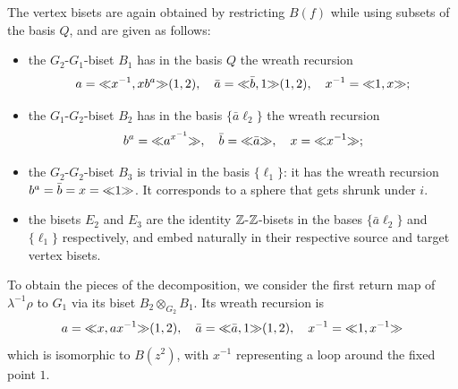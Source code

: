 \documentclass{amsart}
\begin{document}
The vertex bisets are again obtained by restricting $B(f)$
while using subsets of the basis $Q$, and are given as follows:
\begin{itemize}
\item the $G_2$-$G_1$-biset $B_1$ has in the basis $Q$ the wreath
  recursion
  \[a={\ll}x^{-1},x b^a{\gg}(1,2),\quad \bar a={\ll}\bar b,1{\gg}(1,2),\quad x^{-1}={\ll}1,x{\gg};\]
\item the $G_1$-$G_2$-biset $B_2$ has in the basis $\{\bar a\ell_2\}$ the
  wreath recursion
  \[b^a={\ll}a^{x^{-1}}{\gg},\quad \bar b={\ll}\bar a{\gg},\quad x={\ll}x^{-1}{\gg};\]
\item the $G_2$-$G_2$-biset $B_3$ is trivial in the basis
  $\{\ell_1\}$: it has the wreath recursion $b^a=\bar
  b=x={\ll}1{\gg}$. It corresponds to a sphere that gets shrunk under $i$.
\item the bisets $E_2$ and $E_3$ are the identity ${\mathbb Z}$-${\mathbb Z}$-bisets in
  the bases $\{\bar a\ell_2\}$ and $\{\ell_1\}$ respectively, and
  embed naturally in their respective source and target vertex bisets.
\end{itemize}

To obtain the pieces of the decomposition, we consider the first
return map of $\lambda^{-1}\rho$ to $G_1$ via its biset
$B_2\otimes_{G_2}B_1$. Its wreath recursion is
\[a={\ll}x,ax^{-1}{\gg}(1,2),\quad \bar a={\ll}\bar a,1{\gg}(1,2),\quad
x^{-1}={\ll}1,x^{-1}{\gg}\]
which is isomorphic to $B(z^2)$, with $x^{-1}$ representing a loop
around the fixed point $1$.
\end{document}
